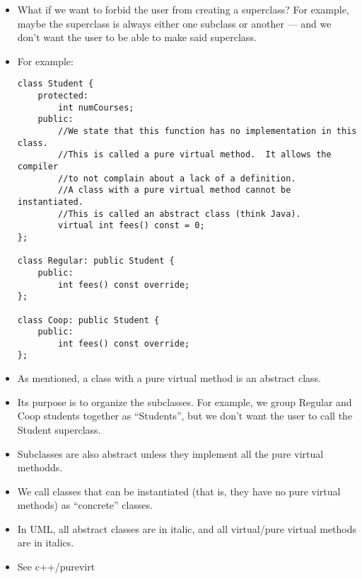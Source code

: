 \documentclass{article}
\begin{document}
\begin{itemize}
\begin{lstlisting}
};
\end{lstlisting}
\item What if we want to forbid the user from creating a superclass?  For example, maybe the superclass is always either one subclass or another --- and we don't want the user to be able to make said superclass.
\item For example:
\begin{lstlisting}
class Student {
    protected:
        int numCourses;
    public:
        //We state that this function has no implementation in this class.
        //This is called a pure virtual method.  It allows the compiler
        //to not complain about a lack of a definition.
        //A class with a pure virtual method cannot be instantiated.
        //This is called an abstract class (think Java).
        virtual int fees() const = 0;
};

class Regular: public Student {
    public:
        int fees() const override;
};

class Coop: public Student {
    public:
        int fees() const override;
};
\end{lstlisting}
\item As mentioned, a class with a pure virtual method is an abstract class.
\item Its purpose is to organize the subclasses.  For example, we group Regular and Coop students together as ``Students'', but we don't want the user to call the Student superclass.
\item Subclasses are also abstract unless they implement all the pure virtual methodds.
\item We call classes that can be instantiated (that is, they have no pure virtual methods) as ``concrete'' classes.
\item In UML, all abstract classes are in italic, and all virtual/pure virtual methods are in italics.
\item See c++/purevirt
\end{itemize}
\end{document}
